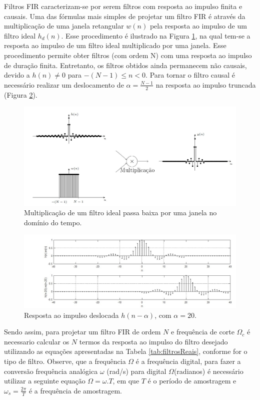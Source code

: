 \documentclass[12pt,addpoints]{exam}
\begin{document}
Filtros FIR  caracterizam-se por serem filtros com resposta ao impulso finita e causais.  Uma das fórmulas mais simples de projetar um filtro FIR é através da multiplicação de uma janela retangular $w(n)$ pela resposta ao impulso de um filtro ideal $h_d(n)$. Esse procedimento é ilustrado na Figura \ref{janelamento}, na qual tem-se a resposta ao impulso de um filtro ideal  multiplicado por uma janela. Esse procedimento permite obter filtros (com ordem N) com uma resposta ao impulso de duração finita. Entretanto, os filtros obtidos ainda permanecem não causais, devido a $h(n)\neq0$ para $-(N-1)\leq n<0$. Para tornar o filtro causal é necessário realizar um deslocamento de $\alpha=\frac{N-1}{2}$ na resposta ao impulso truncada (Figura \ref{fig:sinDeslocada}).

\begin{figure}[t]
	\centering
		\includegraphics[width=1.0\textwidth]{./Figuras/filtroPassaBaixaMultiplicacaoJanela.JPG}
		\caption{Multiplicação de um filtro ideal passa baixa por uma janela no domínio do tempo.} 
	\label{janelamento}
\end{figure}

		
\begin{figure}[htb]
	\centering
		\includegraphics[width=1.0\textwidth]{./Figuras/sincDeslocada.jpg}
	\caption{Resposta ao impulso deslocada $h(n-\alpha)$, com $\alpha=20$.}
	\label{fig:sinDeslocada}
\end{figure}

Sendo assim, para projetar um filtro FIR de ordem $N$ e frequência de corte $\Omega_c$ é necessario calcular os $N$ termos da resposta ao impulso do filtro desejado utilizando as equações apresentadas na Tabela    \ref{tab:filtrosReais}, conforme for o tipo de filtro. Observe, que a frequência $\Omega$ é a frequência digital, para fazer a conversão frequência analógica $\omega$  (rad/s) para digital $\Omega$(radianos) é necessário utilizar a seguinte equação $\Omega=\omega.T$, em que $T$ é o período de amostragem e $\omega_s=\frac{2 \pi}{T}$ é a frequência de amostragem.
\end{document}
